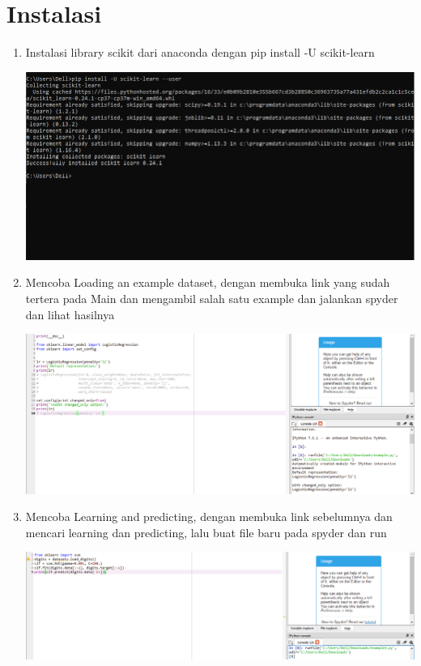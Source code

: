 \section{Instalasi}
\begin{enumerate}
    \item Instalasi library scikit dari anaconda dengan pip install -U scikit-learn
     \begin{center}
    \includegraphics[width=.8\textwidth]{figures/1184098/chapter 1/00.png}
    \end{center}
    \item Mencoba Loading an example dataset, dengan membuka link yang sudah tertera pada Main dan mengambil salah satu example dan jalankan spyder dan lihat hasilnya
     \begin{center}
    \includegraphics[width=.8\textwidth]{figures/1184098/chapter 1/01.png}
    \end{center}
    \item Mencoba Learning and predicting, dengan membuka link sebelumnya dan mencari learning dan predicting, lalu buat file baru pada spyder dan run
    \begin{center}
    \includegraphics[width=.8\textwidth]{figures/1184098/chapter 1/03.png}
    \end{center}

\end{enumerate}
